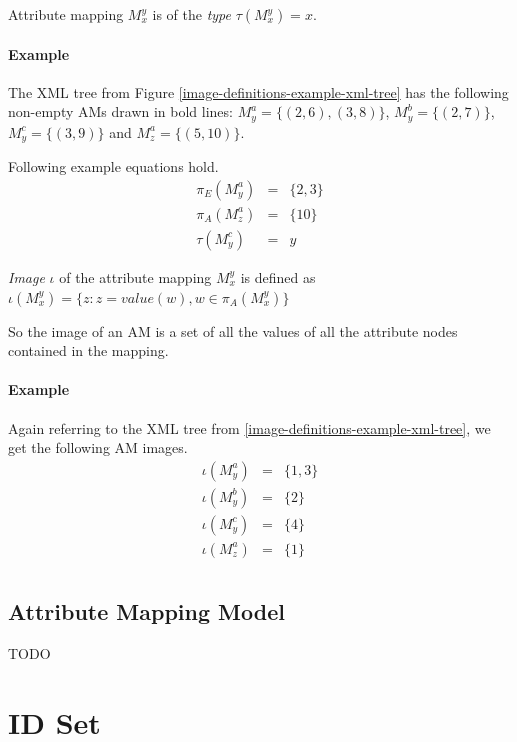 \begin{define}
	Attribute mapping $M_{x}^{y}$ is of the \textit{type} $\tau(M_{x}^{y}) = x$.
\end{define}

\paragraph{Example}
The XML tree from Figure \ref{image-definitions-example-xml-tree} has the following non-empty AMs drawn in bold lines: $M_{y}^{a} = \{(2,6), (3,8)\}$, $M_{y}^{b} = \{(2,7)\}$, $M_{y}^{c} = \{(3,9)\}$ and $M_{z}^{a} = \{(5,10)\}$.

Following example equations hold.
\begin{eqnarray*}
\pi_E(M_{y}^{a}) & = & \{2, 3\} \\
\pi_A(M_{z}^{a}) & = & \{10\} \\
\tau(M_{y}^{c}) & = & y
\end{eqnarray*}

\begin{define}
	\textit{Image} $\iota$ of the attribute mapping $M_{x}^{y}$ is defined as $\iota(M_{x}^{y}) = \{z: z = value(w), w \in \pi_A(M_{x}^{y})\}$
\end{define}

So the image of an AM is a set of all the values of all the attribute nodes contained in the mapping.

\paragraph{Example}
Again referring to the XML tree from \ref{image-definitions-example-xml-tree}, we get the following AM images.
\begin{eqnarray*}
\iota(M_{y}^{a}) & = & \{1, 3\} \\
\iota(M_{y}^{b}) & = & \{2\} \\
\iota(M_{y}^{c}) & = & \{4\} \\
\iota(M_{z}^{a}) & = & \{1\} \\
\end{eqnarray*}

\subsection{Attribute Mapping Model}

TODO

\section{ID Set}

